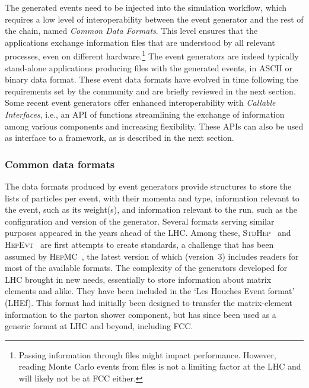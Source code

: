 The generated events need to be injected into the simulation workflow, 
which requires a low level of interoperability between the event generator and the rest of the chain, 
named \emph{Common Data Formats}.
This level ensures that the applications exchange information files that are understood by all relevant processes, 
even on different hardware.\footnote{Passing information through files might impact performance. 
However, reading Monte Carlo events from files is not a limiting factor at the LHC and will likely not be at FCC either.}
The event generators are indeed typically stand-alone applications producing files with the generated events, 
in ASCII or binary data format. 
These event data formats have evolved in time following the requirements set by the community and are briefly reviewed in the next section. 
Some recent event generators offer enhanced interoperability with \emph{Callable Interfaces}, 
i.e., an API of functions streamlining the exchange of information among various components and increasing flexibility. 
These APIs can also be used as interface to a framework, as is described in the next section. 

\subsubsection{Common data formats}

The data formats produced by event generators provide structures to store the lists of particles per event, 
with their momenta and type, information relevant to the event, such as its weight(s), 
and information relevant to the run, such as the configuration and version of the generator. 
Several formats serving similar purposes appeared in the years ahead of the LHC. 
Among these, \textsc{StdHep}~\cite{stdhep} and \textsc{HepEvt}~\cite{hepevt} are first attempts to create standards, 
a challenge that has been assumed by \textsc{HepMC}~\cite{hepMC}, 
the latest version of which (version~3) includes readers for most of the available formats. 
The complexity of the generators developed for LHC brought in new needs, 
essentially to store information about matrix elements and alike. 
They have been included in the `Les Houches Event format' (LHEf). 
This format had initially been designed to transfer the matrix-element information to the parton shower component, 
but has since been used as a generic format at LHC and beyond, including FCC.

